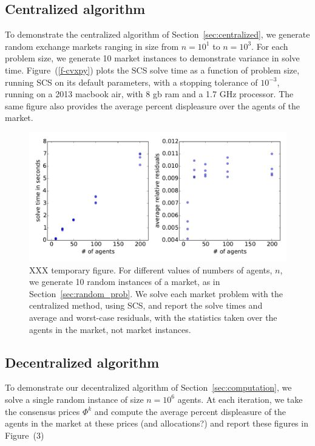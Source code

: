 \documentclass[12pt]{article}
\begin{document}
\subsection{Centralized algorithm}
To demonstrate the centralized algorithm of Section~\ref{sec:centralized},
we generate random exchange markets ranging in size
from $n=10^1$ to $n=10^3$.
For each problem size, we generate 10 market instances to demonstrate
variance in solve time.
Figure~(\ref{f-cvxpy}) %
plots the SCS solve time as a function of problem size, running
SCS on its default parameters, with a stopping tolerance of $10^{-3}$,
running on a 2013 macbook air, with 8 gb ram and a 1.7 GHz processor.
The same figure also provides the average percent displeasure over the agents of the market.


\begin{figure}
\begin{center}
\includegraphics[width=1.0\textwidth]{figures/cvxpy}
\caption{XXX temporary figure. For different values of numbers of agents, $n$,
we generate 10 random instances of a market, as in Section~\ref{sec:random_prob}. We solve each market problem with the centralized method, using SCS, and report the solve times and average and worst-case residuals, with the statistics taken over the agents in the market, not market instances. }
\end{center}
\label{f-admm}
\end{figure}


\subsection{Decentralized algorithm}
To demonstrate our decentralized algorithm of Section~\ref{sec:computation},
we solve a single random instance of size $n=10^6$ agents.
At each iteration, we take the consensus prices $\Phi^k$ and compute
the average percent displeasure of the agents in the market at
these prices (and allocations?) and report these figures
in Figure~(3) %
\end{document}
